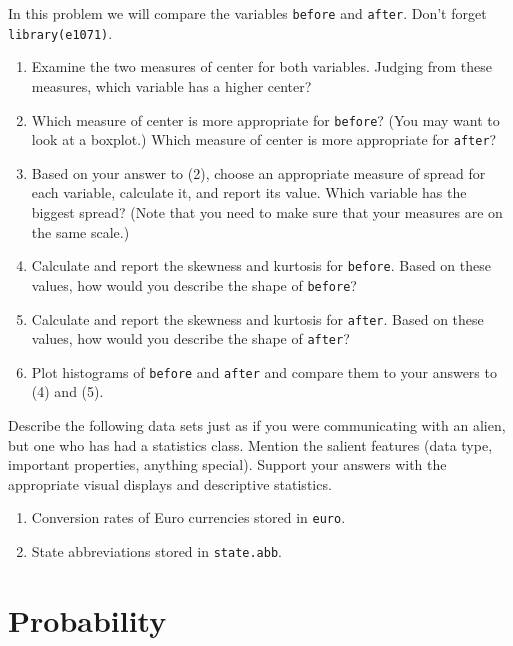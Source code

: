 \documentclass[captions=tableheading]{scrbook}
\begin{document}
\begin{xca}
In this problem we will compare the variables \texttt{before} and \texttt{after}. Don't forget \texttt{library(e1071)}.
\begin{enumerate}
\item Examine the two measures of center for both variables. Judging from these measures, which variable has a higher center?
\item Which measure of center is more appropriate for \texttt{before}? (You may want to look at a boxplot.) Which measure of center is more appropriate for \texttt{after}?
\item Based on your answer to (2), choose an appropriate measure of spread for each variable, calculate it, and report its value. Which variable has the biggest spread? (Note that you need to make sure that your measures are on the same scale.)
\item Calculate and report the skewness and kurtosis for \texttt{before}. Based on these values, how would you describe the shape of \texttt{before}?
\item Calculate and report the skewness and kurtosis for \texttt{after}. Based on these values, how would you describe the shape of \texttt{after}?
\item Plot histograms of \texttt{before} and \texttt{after} and compare them to your answers to (4) and (5).
\end{enumerate}

\end{xca}

\begin{xca}
Describe the following data sets just as if you were communicating with an alien, but one who has had a statistics class. Mention the salient features (data type, important properties, anything special). Support your answers with the appropriate visual displays and descriptive statistics.
\begin{enumerate}
\item Conversion rates of Euro currencies stored in \texttt{euro}.
\item State abbreviations stored in \texttt{state.abb}.
\end{enumerate}

\end{xca}
\chapter{Probability}
\label{sec-4}

\label{cha:Probability}
\end{document}
